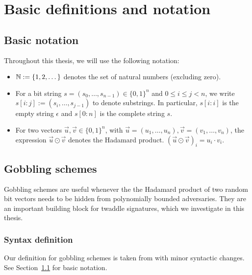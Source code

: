 \chapter{Basic definitions and notation}

\section{Basic notation}
\label{sec:basicnotation}
Throughout this thesis, we will use the following notation:
\begin{itemize}
	\item $\mathbb{N} := \{1,2,\dots\}$ denotes the set of natural numbers (excluding zero). %
	\item For a bit string $s = (s_0,\dots,s_{n-1}) \in \{0,1\}^n$ and $0\leq i \leq j < n$, we write $s[i:j] := (s_i, \dots, s_{j-1})$ to denote substrings.
	In particular, $s[i:i]$ is the empty string $\epsilon$ and $s[0:n]$ is the complete string $s$. 
	\item For two vectors $\vec{u},\vec{v}\in \{0,1\}^n$, with $\vec{u}=(u_1,\dots,u_n), \vec{v} = (v_1,\dots,v_n)$, the expression $\vec{u}\odot\vec{v}$ denotes the Hadamard product. $(\vec{u}\odot\vec{v})_i = u_i\cdot v_i$.
\end{itemize}

\section{Gobbling schemes}
Gobbling schemes  are useful whenever the the Hadamard product of two random bit vectors needs to be hidden from polynomially bounded adversaries. 
They are an important building block for twaddle signatures, which we investigate in this thesis.
\subsection{Syntax definition}
Our definition for gobbling schemes is taken from \cite{testref}  with minor syntactic changes. 
See Section~\ref{sec:basicnotation}  for basic notation.

